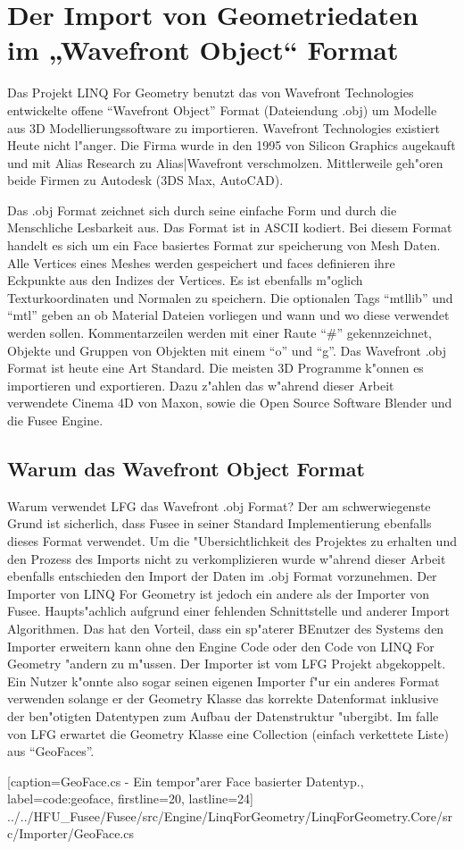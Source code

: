 \documentclass[pagesize, paper=a4, fontsize=12pt,titlepage=true, headings=small, headnosepline, abstractoff, liststotoc, nochapterprefix, plainheadsepline]{scrreprt}
\newcommand{\LFGS}{LINQ For Geometry }
\begin{document}
	\section {Der Import von Geometriedaten im „Wavefront Object“ Format}
		Das Projekt \LFGS benutzt das von Wavefront Technologies entwickelte offene "`Wavefront Object"' Format (Dateiendung .obj) um Modelle aus 3D Modellierungssoftware zu importieren. Wavefront Technologies existiert Heute nicht l"anger. Die Firma wurde in den 1995 von Silicon Graphics augekauft und mit Alias Research zu Alias|Wavefront verschmolzen. Mittlerweile geh"oren beide Firmen zu Autodesk (3DS Max, AutoCAD).

Das .obj Format zeichnet sich durch seine einfache Form und durch die Menschliche Lesbarkeit aus. Das Format ist in ASCII kodiert. Bei diesem Format handelt es sich um ein Face basiertes Format zur speicherung von Mesh Daten. Alle Vertices eines Meshes werden gespeichert und faces definieren ihre Eckpunkte aus den Indizes der Vertices. Es ist ebenfalls m"oglich Texturkoordinaten und Normalen zu speichern. Die optionalen Tags "`mtllib"' und "`mtl"' geben an ob Material Dateien vorliegen und wann und wo diese verwendet werden sollen. Kommentarzeilen werden mit einer Raute "`\#"' gekennzeichnet, Objekte und Gruppen von Objekten mit einem "`o"' und "`g"'. Das Wavefront .obj Format ist heute eine Art Standard. Die meisten 3D Programme k"onnen es importieren und exportieren. Dazu z"ahlen das w"ahrend dieser Arbeit verwendete Cinema 4D von Maxon, sowie die Open Source Software Blender und die Fusee Engine.
		\subsection {Warum das Wavefront Object Format}
			Warum verwendet LFG das Wavefront .obj Format? Der am schwerwiegenste Grund ist sicherlich, dass Fusee in seiner Standard Implementierung ebenfalls dieses Format verwendet. Um die "Ubersichtlichkeit des Projektes zu erhalten und den Prozess des Imports nicht zu verkomplizieren wurde w"ahrend dieser Arbeit ebenfalls entschieden den Import der Daten im .obj Format vorzunehmen. Der Importer von \LFGS ist jedoch ein andere als der Importer von Fusee. Haupts"achlich aufgrund einer fehlenden Schnittstelle und anderer Import Algorithmen. Das hat den Vorteil, dass ein sp"aterer BEnutzer des Systems den Importer erweitern kann ohne den Engine Code oder den Code von \LFGS "andern zu m"ussen. Der Importer ist vom LFG Projekt abgekoppelt. Ein Nutzer k"onnte also sogar seinen eigenen Importer f"ur ein anderes Format verwenden solange er der Geometry Klasse das korrekte Datenformat inklusive der ben"otigten Datentypen zum Aufbau der Datenstruktur "ubergibt. Im falle von LFG erwartet die Geometry Klasse eine Collection (einfach verkettete Liste) aus "`GeoFaces"'.

			[caption={GeoFace.cs - Ein tempor"arer Face basierter Datentyp.}, label=code:geoface, firstline=20, lastline=24]
			{../../HFU_Fusee/Fusee/src/Engine/LinqForGeometry/LinqForGeometry.Core/src/Importer/GeoFace.cs}
\end{document}
